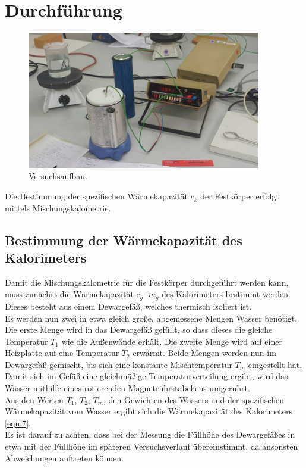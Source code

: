 \section{Durchführung}
\label{sec:Durchfuehrung}

\begin{figure}[H]
  \centering
  \includegraphics[height=6cm]{aufbau.png}
  \caption{Versuchsaufbau.}
  \label{fig:aufbau}
\end{figure}


Die Bestimmung der spezifischen Wärmekapazität $c_k$ der Festkörper erfolgt mittels Mischungskalometrie.
\subsection{Bestimmung der Wärmekapazität des Kalorimeters}
Damit die Mischungskalometrie für die Festkörper durchgeführt werden kann, muss zunächst die Wärmekapazität $c_g \cdot m_g$ des Kalorimeters bestimmt werden.
Dieses besteht aus einem Dewargefäß, welches thermisch isoliert ist. \\
Es werden nun zwei in etwa gleich große, abgemessene Mengen Wasser benötigt.
Die erste Menge wird in das Dewargefäß gefüllt, so dass dieses die gleiche Temperatur $T_1$ wie die Außenwände erhält.
Die zweite Menge wird auf einer Heizplatte auf eine Temperatur $T_2$ erwärmt.
Beide Mengen werden nun im Dewargefäß gemischt, bis sich eine konstante Mischtemperatur $T_m$ eingestellt hat.
Damit sich im Gefäß eine gleichmäßige Temperaturverteilung ergibt, wird das Wasser mithilfe eines rotierenden Magnetrührstäbchens umgerührt. \\
Aus den Werten $T_1$, $T_2$, $T_m$, den Gewichten des Wassers und der spezifischen Wärmekapazität vom Wasser ergibt sich die Wärmekapazität des Kalorimeters \ref{eqn:7}. \\
Es ist darauf zu achten, dass bei der Messung die Füllhöhe des Dewargefäßes in etwa mit der Füllhöhe im späteren Versuchsverlauf übereinstimmt, da ansonsten Abweichungen auftreten können.

